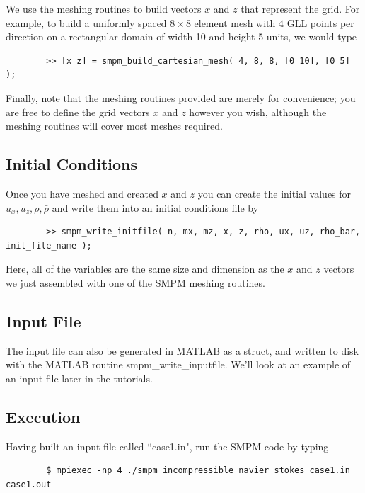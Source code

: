 \documentclass[onside]{article}
\begin{document}
	We use the meshing routines to build vectors $x$ and $z$ that represent the grid.  For example, to build a uniformly spaced $8 \times 8$ element mesh with $4$ GLL points per direction on a rectangular domain of width 10 and height 5 units, we would type
	
	\begin{verbatim}
		>> [x z] = smpm_build_cartesian_mesh( 4, 8, 8, [0 10], [0 5] );
	\end{verbatim}
	
	Finally, note that the meshing routines provided are merely for convenience; you are free to define the grid vectors $x$ and $z$ however you wish, although the meshing routines will cover most meshes required.
	
	\subsection{Initial Conditions}
	
	Once you have meshed and created $x$ and $z$ you can create the initial values for $u_x, u_z, \rho, \bar{\rho}$ and write them into an initial conditions file by 
	\begin{verbatim}
		>> smpm_write_initfile( n, mx, mz, x, z, rho, ux, uz, rho_bar, init_file_name );
	\end{verbatim}
	
	Here, all of the variables are the same size and dimension as the $x$ and $z$ vectors we just assembled with one of the SMPM meshing routines.
	
	\subsection{Input File}
	
	The input file can also be generated in MATLAB as a struct, and written to disk with the MATLAB routine smpm\_write\_inputfile.  We'll look at an example of an input file later in the tutorials.
	
	\subsection{Execution}
	
	Having built an input file called ``case1.in", run the SMPM code by typing
	
	\begin{verbatim}
		$ mpiexec -np 4 ./smpm_incompressible_navier_stokes case1.in case1.out
	\end{verbatim}
	
\end{document}
